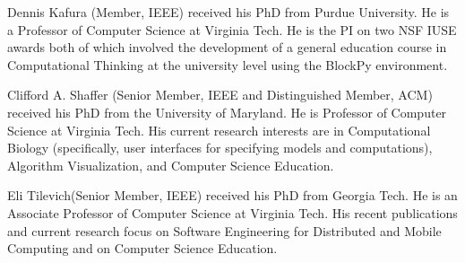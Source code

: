 \documentclass[10pt,journal,compsoc]{IEEEtran}
\begin{document}
\begin{IEEEbiography}{Dennis Kafura} (Member, IEEE) received his PhD from Purdue University. He is a Professor of Computer Science at Virginia Tech. He is the PI on two NSF IUSE awards both of which involved the development of a general education course in Computational Thinking at the university level using the BlockPy environment.
\end{IEEEbiography}

\begin{IEEEbiography}{Clifford A. Shaffer} (Senior Member, IEEE and Distinguished Member, ACM) received his PhD from the University of Maryland.
He is Professor of Computer Science at Virginia Tech.
His current research interests are in Computational Biology (specifically, user interfaces for specifying models and computations), Algorithm Visualization, and Computer Science Education.

\end{IEEEbiography}

\begin{IEEEbiography}{Eli Tilevich}(Senior Member, IEEE) received his PhD from Georgia Tech.
He is an Associate Professor of Computer Science at Virginia Tech. His recent publications and current research focus on Software Engineering for Distributed and Mobile Computing and on Computer Science Education.
\end{IEEEbiography}


\end{document}
